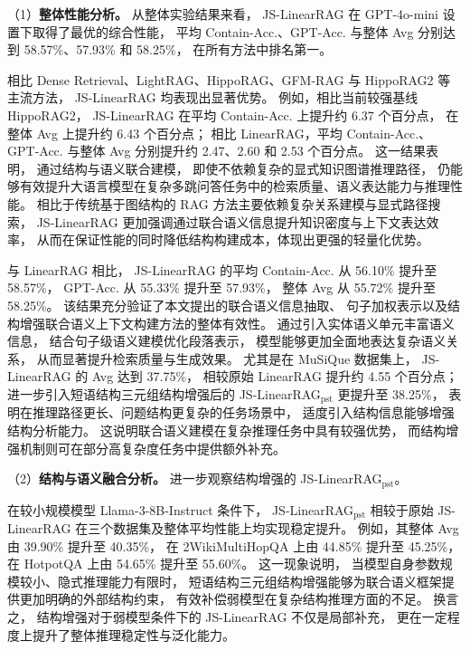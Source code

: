 （1）\textbf{整体性能分析。}
从整体实验结果来看，
JS-LinearRAG 在 GPT-4o-mini 设置下取得了最优的综合性能，
平均 Contain-Acc.、GPT-Acc. 与整体 Avg 分别达到 58.57\%、57.93\% 和 58.25\%，
在所有方法中排名第一。

相比 Dense Retrieval、LightRAG、HippoRAG、GFM-RAG 与 HippoRAG2 等主流方法，
JS-LinearRAG 均表现出显著优势。
例如，相比当前较强基线 HippoRAG2，
JS-LinearRAG 在平均 Contain-Acc. 上提升约 6.37 个百分点，
在整体 Avg 上提升约 6.43 个百分点；
相比 LinearRAG，平均 Contain-Acc.、GPT-Acc. 与整体 Avg 分别提升约 2.47、2.60 和 2.53 个百分点。
这一结果表明，
通过结构与语义联合建模，
即使不依赖复杂的显式知识图谱推理路径，
仍能够有效提升大语言模型在复杂多跳问答任务中的检索质量、语义表达能力与推理性能。
相比于传统基于图结构的 RAG 方法主要依赖复杂关系建模与显式路径搜索，
JS-LinearRAG 更加强调通过联合语义信息提升知识密度与上下文表达效率，
从而在保证性能的同时降低结构构建成本，体现出更强的轻量化优势。

与 LinearRAG 相比，
JS-LinearRAG 的平均 Contain-Acc. 从 56.10\% 提升至 58.57\%，
GPT-Acc. 从 55.33\% 提升至 57.93\%，
整体 Avg 从 55.72\% 提升至 58.25\%。
该结果充分验证了本文提出的联合语义信息抽取、
句子加权表示以及结构增强联合语义上下文构建方法的整体有效性。
通过引入实体语义单元丰富语义信息，
结合句子级语义建模优化段落表示，
模型能够更加全面地表达复杂语义关系，
从而显著提升检索质量与生成效果。
尤其是在 MuSiQue 数据集上，
JS-LinearRAG 的 Avg 达到 37.75\%，
相较原始 LinearRAG 提升约 4.55 个百分点；
进一步引入短语结构三元组结构增强后的 JS-LinearRAG$_{\text{pst}}$ 更提升至 38.25\%，
表明在推理路径更长、问题结构更复杂的任务场景中，
适度引入结构信息能够增强结构分析能力。
这说明联合语义建模在复杂推理任务中具有较强优势，
而结构增强机制则可在部分高复杂度任务中提供额外补充。

（2）\textbf{结构与语义融合分析。}
进一步观察结构增强的 JS-LinearRAG$_{\text{pst}}$。

在较小规模模型 Llama-3-8B-Instruct 条件下，
JS-LinearRAG$_{\text{pst}}$ 相较于原始 JS-LinearRAG 在三个数据集及整体平均性能上均实现稳定提升。
例如，其整体 Avg 由 39.90\% 提升至 40.35\%，
在 2WikiMultiHopQA 上由 44.85\% 提升至 45.25\%，
在 HotpotQA 上由 54.65\% 提升至 55.60\%。
这一现象说明，
当模型自身参数规模较小、隐式推理能力有限时，
短语结构三元组结构增强能够为联合语义框架提供更加明确的外部结构约束，
有效补偿弱模型在复杂结构推理方面的不足。
换言之，
结构增强对于弱模型条件下的 JS-LinearRAG 不仅是局部补充，
更在一定程度上提升了整体推理稳定性与泛化能力。


